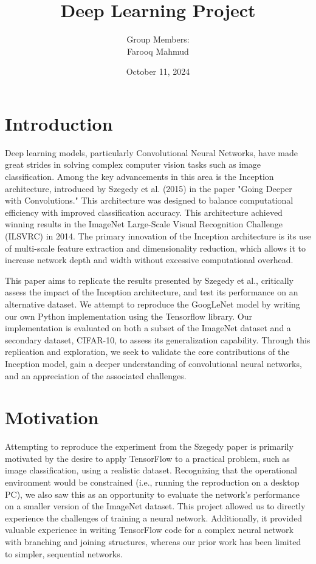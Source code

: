 \documentclass{article}
\title{Deep Learning Project}
\author{
    Group Members: \\
    Farooq Mahmud
}
\date{October 11, 2024}
\begin{document}
\maketitle

\section{Introduction}
Deep learning models, particularly Convolutional Neural Networks, have made great strides in solving complex computer vision tasks such as image classification. Among the key advancements in this area is the Inception architecture, introduced by Szegedy et al. (2015) in the paper "Going Deeper with Convolutions." This architecture was designed to balance computational efficiency with improved classification accuracy. This architecture achieved winning results in the ImageNet Large-Scale Visual Recognition Challenge (ILSVRC) in 2014. The primary innovation of the Inception architecture is its use of multi-scale feature extraction and dimensionality reduction, which allows it to increase network depth and width without excessive computational overhead\cite{szegedy2015going}.

This paper aims to replicate the results presented by Szegedy et al., critically assess the impact of the Inception architecture, and test its performance on an alternative dataset. We attempt to reproduce the GoogLeNet model by writing our own Python implementation using the Tensorflow library. Our implementation is evaluated on both a subset of the ImageNet dataset and a secondary dataset, CIFAR-10, to assess its generalization capability. Through this replication and exploration, we seek to validate the core contributions of the Inception model, gain a deeper understanding of convolutional neural networks, and an appreciation of the associated challenges.

\section {Motivation}
Attempting to reproduce the experiment from the Szegedy paper is primarily motivated by the desire to apply TensorFlow to a practical problem, such as image classification, using a realistic dataset. Recognizing that the operational environment would be constrained (i.e., running the reproduction on a desktop PC), we also saw this as an opportunity to evaluate the network's performance on a smaller version of the ImageNet dataset. This project allowed us to directly experience the challenges of training a neural network. Additionally, it provided valuable experience in writing TensorFlow code for a complex neural network with branching and joining structures, whereas our prior work has been limited to simpler, sequential networks.
\end{document}
